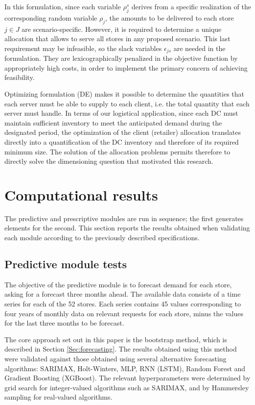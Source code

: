 \documentclass[opre,sglanonrev,11pt]{informs4}
\begin{document}
In this formulation, since each variable $\rho_j^s$ derives from a specific realization of the corresponding random variable $\rho_j$, the amounts to be delivered to each store $j \in J$ are scenario-specific. However, it is required to determine a unique allocation that allows to serve all stores in any proposed scenario. This last requirement may be infeasible, so the slack variables $\epsilon_{js}$ are needed in the formulation. They are lexicographically penalized in the objective function by appropriately high costs, in order to implement the primary concern of achieving feasibility.

Optimizing formulation (DE) makes it possible to determine the quantities that each server must be able to supply to each client, i.e. the total quantity that each server must handle. 
In terms of our logistical application, since each DC must maintain sufficient inventory to meet the anticipated demand during the designated period, the optimization of the client (retailer) allocation translates directly into a quantification of the DC inventory and therefore of its required minimum size. The solution of the allocation problems permits therefore to directly solve the dimensioning question that motivated this research.

\section{Computational results} \label{Sec:results}

The predictive and prescriptive modules are run in sequence; the first generates elements for the second. This section reports the results obtained when validating each module according to the previously described specifications.

\subsection{Predictive module tests} \label{Subsec:predictive}

The objective of the predictive module is to forecast demand for each store, asking for a forecast three months ahead.
The available data consists of a time series for each of the 52 stores. Each series contains 45 values corresponding to four years of monthly data on relevant requests for each store, minus the values for the last three months to be forecast.

The core approach set out in this paper is the bootstrap method, which is described in Section \ref{Sec:forecasting}. The results obtained using this method were validated against those obtained using several alternative forecasting algorithms: SARIMAX, Holt-Winters, MLP, RNN (LSTM), Random Forest and Gradient Boosting (XGBoost). The relevant hyperparameters were determined by grid search for integer-valued algorithms such as SARIMAX, and by Hammersley sampling \citep{H60} for real-valued algorithms.
\end{document}
